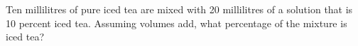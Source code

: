 Ten millilitres of pure iced tea are mixed with 20 millilitres of a solution that is 10 percent iced tea. Assuming volumes add, what percentage of the mixture is iced tea?
